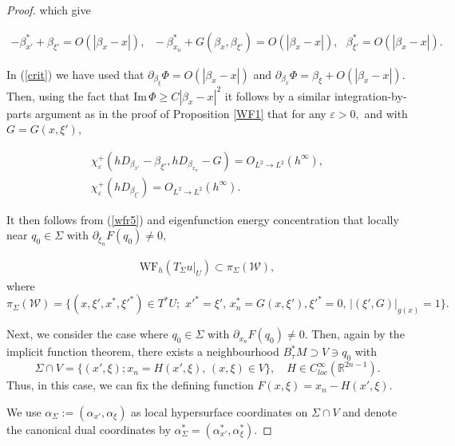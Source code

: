 \documentclass[11pt,reqno]{amsart}
\newcommand{\R}{{\mathbb R}}
\newcommand{\ep}{\varepsilon}
\renewcommand{\Im} {\mathrm{Im\,}}
\theoremstyle{definition}
\begin{document}
\begin{proof}
which give 

\begin{eqnarray} \label{crit}
 - \beta_{x'}^* + \beta_{\xi'}  = O(|\beta_{x} -x|),  \,\,\,\, -\beta_{x_n}^* + G(\beta_x,\beta_{\xi'}) = O(|\beta_x -x|), \,\,\,\,
  \beta_{\xi'}^* = O(|\beta_x -x|). 
\end{eqnarray}

In (\ref{crit}) we have used that $\partial_{\beta_{\xi}} \Phi = O(|\beta_x -x|)$ and $\partial_{\beta_x} \Phi = \beta_{\xi}  + O(|\beta_x -x|).$ Then, using the fact that $\Im \Phi \geq C |\beta_x -x|^2 $ it follows by a similar integration-by-parts argument as in the proof of Proposition \ref{WF1} that for any $\ep >0,$ and with $G = G(x,\xi'),$

\begin{eqnarray} \label{wfr5}
\chi_{\ep}^{+}( hD_{\beta_{x'}} - \beta_{\xi'}, h D_{\beta_{x_n}} - G) = O_{L^2 \to L^2}(h^{\infty}), \nonumber \\
\chi_{\ep}^{+}( hD_{\beta_{\xi'} }) = O_{L^2 \to L^2}(h^{\infty}).
\end{eqnarray}



It then follows from (\ref{wfr5}) and eigenfunction energy concentration that locally near $q_0 \in \Sigma$ with $\partial_{\xi_n} F(q_0) \neq 0,$

\begin{eqnarray} \label{wfr6}
\text{WF}_h (T_{\Sigma} u |_{U} ) \subset \pi_{\Sigma}({\mathcal W}), \end{eqnarray}
where
$$ \pi_{\Sigma}({\mathcal W}) = \big\{ (x,\xi', x^*, \xi'^*) \in T^* U ; \,\, x'^* = \xi', \, x_n^* = G(x,\xi'), \xi'^* = 0, \, |(\xi', G) |_{g(x)} = 1  \big\}.$$

Next, we consider the case where $q_0 \in \Sigma $ with $\partial_{x_n} F (q_0) \neq 0.$ Then, again by the implicit function theorem, there exists a neighbourhood $B_\tau^* M \supset V \ni q_0$  with 
$$ \Sigma \cap V = \{ (x',\xi); x_n = H(x',\xi), \, (x,\xi) \in V \}, \quad H \in C_{loc}^{\infty}(\R^{2n-1}).$$
Thus, in this case, we can fix the defining function $F(x,\xi) = x_n - H(x',\xi).$

We use $\alpha_{\Sigma}:= (\alpha_{x'},\alpha_\xi)$ as local  hypersurface  coordinates on $\Sigma \cap V$ and denote the canonical dual coordinates by $\alpha_{\Sigma}^* = (\alpha_{x'}^*,\alpha_\xi^*).$





\end{proof}
\end{document}
